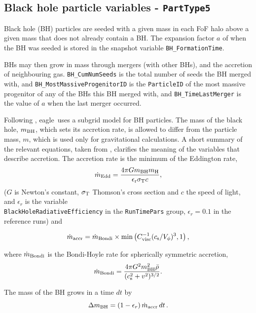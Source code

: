 \documentclass[10pt, a4paper]{article}
\newcommand{\eagle}{{\sc eagle}}
\begin{document}
\subsection{Black hole particle variables - \texttt{PartType5}}
\label{sect:BH}
Black hole (BH) particles are seeded with a given mass in each FoF halo above a
given mass that does not already contain a BH. The expansion factor $a$ of when
the BH was seeded is stored in the snapshot variable
\texttt{BH\_FormationTime}.

BHs may then grow in mass through mergers (with other BHs), and the accretion
of neighbouring gas.  \texttt{BH\_CumNumSeeds} is the total number of seeds the
BH merged with, and \texttt{BH\_MostMassiveProgenitorID} is the
\texttt{ParticleID} of the most massive progenitor of any of the BHs this BH
merged with, and \texttt{BH\_TimeLastMerger} is the value of $a$ when the last
merger occurred.

Following \cite{springel2005b}, \eagle\ uses a subgrid model for BH particles.
The mass of the black hole, $m_{\rm BH}$, which sets its accretion rate, is
allowed to differ from the particle mass, $m$, which is used only for
gravitational calculations. A short summary of the relevant equations, taken
from \cite{schaye2015}, clarifies the meaning of the variables that describe
accretion. The accretion rate is the minimum of the Eddington rate,
\begin{equation} \dot{m}_{\rm Edd} = \frac{4\pi G m_{\rm BH} m_{\rm
H}}{\epsilon_{\rm r} \sigma_{\rm T} c}, \end{equation} ($G$ is Newton's
constant, $\sigma_{\rm T}$ Thomson's cross section and $c$ the speed of light,
and $\epsilon_r$ is the variable \\ \texttt{BlackHoleRadiativeEfficiency} in
the \texttt{RunTimePars} group, $\epsilon_r=0.1$ in the {\sc reference runs})
and

\begin{equation}
\dot{m}_{\rm accr} = \dot{m}_{\rm Bondi} \times \min\left
(C_{\rm visc}^{-1}(c_{\rm s}/V_\phi)^3,1 \right ),
\label{eq:mdotaccr}
\end{equation}

\noindent where $\dot{m}_{\rm Bondi}$ is the Bondi-Hoyle rate for
spherically symmetric accretion, \begin{equation} \dot{m}_{\rm Bondi} =
\frac{4\pi G^2 m_{\rm BH}^2 \bar{\rho}}{(c_{\rm s}^2 + v^2)^{3/2}}.
\end{equation}

\noindent The mass of the BH grows in a time $dt$ by \begin{equation} \Delta
m_{\rm BH} = (1-\epsilon_r)\,\dot m_{\rm accr}\,dt\,. \end{equation} \noindent
\end{document}
